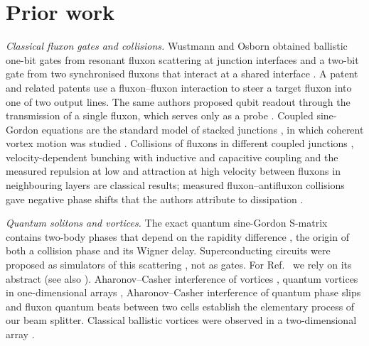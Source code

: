 \documentclass[10pt,twocolumn,letterpaper]{article}
\begin{document}
\section{Prior work}
\label{sec:prior}

\emph{Classical fluxon gates and collisions.} Wustmann and Osborn obtained ballistic one-bit gates from resonant
fluxon scattering at junction interfaces and a two-bit gate from two synchronised fluxons that interact at a shared
interface \cite{WustmannOsborn2020}. A patent \cite{Osborn2017} and related patents \cite{RelatedPatents} use a
fluxon--fluxon interaction to steer a target fluxon into one of two output lines. The same authors proposed qubit
readout through the transmission of a single fluxon, which serves only as a probe \cite{WustmannOsborn2026}. Coupled
sine-Gordon equations are the standard model of stacked junctions \cite{Sakai1993}, in which coherent vortex motion was
studied \cite{Kleiner1994}. Collisions of fluxons
in different coupled junctions \cite{KivsharMalomed1988}, velocity-dependent bunching with inductive and capacitive
coupling \cite{GronbechJensen1994} and the measured repulsion at low and attraction at high velocity between fluxons in
neighbouring layers \cite{UstinovKohlstedt1996} are classical results; measured fluxon--antifluxon collisions gave
negative phase shifts that the authors attribute to dissipation \cite{Fujimaki1987,Nakajima1990}.

\emph{Quantum solitons and vortices.} The exact quantum sine-Gordon S-matrix contains two-body phases that depend on
the rapidity difference \cite{Zamolodchikov1979}, the origin of both a collision phase and its Wigner delay.
Superconducting circuits were proposed as simulators of this scattering \cite{RoySaleur2019,Roy2021,Rosen2026}, not as
gates. For Ref.~\cite{Wildermuth2023} we rely on its abstract (see also \cite{Wildermuth2022}). Aharonov--Casher
interference of vortices \cite{Elion1993}, quantum vortices in one-dimensional arrays \cite{vanOudenaarden1996},
Aharonov--Casher interference of quantum phase slips \cite{Pop2012} and fluxon quantum beats between two cells
\cite{Moskalenko2021} establish the elementary process of our beam splitter. Classical ballistic vortices were observed
in a two-dimensional array \cite{vanderZant1992}.
\end{document}
